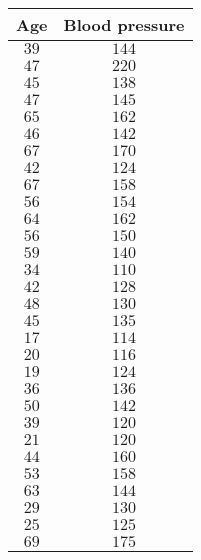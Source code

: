 \begin{tabular}{cc}     \toprule
Age  & Blood pressure \\\midrule
$39$ & $144$          \\[4pt]
$47$ & $220$          \\[4pt]
$45$ & $138$          \\[4pt]
$47$ & $145$          \\[4pt]
$65$ & $162$          \\[4pt]
$46$ & $142$          \\[4pt]
$67$ & $170$          \\[4pt]
$42$ & $124$          \\[4pt]
$67$ & $158$          \\[4pt]
$56$ & $154$          \\[4pt]
$64$ & $162$          \\[4pt]
$56$ & $150$          \\[4pt]
$59$ & $140$          \\[4pt]
$34$ & $110$          \\[4pt]
$42$ & $128$          \\[4pt]
$48$ & $130$          \\[4pt]
$45$ & $135$          \\[4pt]
$17$ & $114$          \\[4pt]
$20$ & $116$          \\[4pt]
$19$ & $124$          \\[4pt]
$36$ & $136$          \\[4pt]
$50$ & $142$          \\[4pt]
$39$ & $120$          \\[4pt]
$21$ & $120$          \\[4pt]
$44$ & $160$          \\[4pt]
$53$ & $158$          \\[4pt]
$63$ & $144$          \\[4pt]
$29$ & $130$          \\[4pt]
$25$ & $125$          \\[4pt]
$69$ & $175$          \\\bottomrule
\end{tabular}
